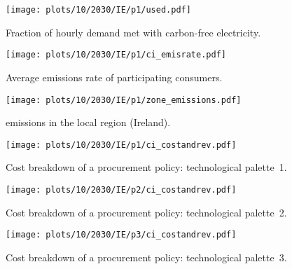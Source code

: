 \begin{figure*}
    \centering
    \begin{subfigure}{0.5\textwidth}
        \centering
        \caption{Fraction of hourly demand met with carbon-free electricity.}
        \texttt{[image: plots/10/2030/IE/p1/used.pdf]}
        \label{fig:10-2030-IE-p1-used}
    \end{subfigure}%
    \begin{subfigure}{0.5\textwidth}
        \centering
        \caption{Average emissions rate of participating consumers.}
        \texttt{[image: plots/10/2030/IE/p1/ci\_emisrate.pdf]}
        \label{fig:10-2030-IE-p1-ci_emisrate}
    \end{subfigure}

    \begin{subfigure}{0.5\textwidth}
        \centering
        \caption{\co emissions in the local region (Ireland).}
        \texttt{[image: plots/10/2030/IE/p1/zone\_emissions.pdf]}
        \label{fig:10-2030-IE-p1-zone_emissions}
    \end{subfigure}%
    \begin{subfigure}{0.5\textwidth}
        \caption{Cost breakdown of a procurement policy: technological palette~1.}
        \texttt{[image: plots/10/2030/IE/p1/ci\_costandrev.pdf]}
        \label{fig:10-2030-IE-p1-ci_costandrev}
    \end{subfigure}%

    \begin{subfigure}{0.5\textwidth}
        \centering
        \caption{Cost breakdown of a procurement policy: technological palette~2.}
        \texttt{[image: plots/10/2030/IE/p2/ci\_costandrev.pdf]}
        \label{fig:10-2030-IE-p2-ci_costandrev}
    \end{subfigure}%
    \begin{subfigure}{0.5\textwidth}
        \centering
        \caption{Cost breakdown of a procurement policy: technological palette~3.}
        \texttt{[image: plots/10/2030/IE/p3/ci\_costandrev.pdf]}
        \label{fig:10-2030-IE-p3-ci_costandrev}
    \end{subfigure}

    \caption{Results for the scenario of Ireland 2030; 10\% participation rate. 
    Figures \ref{fig:10-2030-IE-p1-used}--\ref{fig:10-2030-IE-p1-ci_costandrev} display the technological palette~1 scenario.}
    \label{fig:10-2030-IE-6plots}
\end{figure*}



